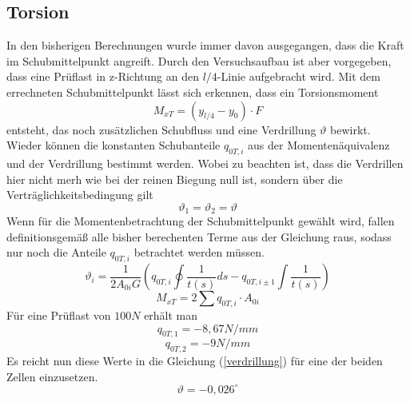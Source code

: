 \subsection{Torsion}
In den bisherigen Berechnungen wurde immer davon ausgegangen, dass die Kraft im Schubmittelpunkt angreift. Durch den Versuchsaufbau ist aber vorgegeben, dass eine Prüflast in z-Richtung an den $l/4$-Linie aufgebracht wird. Mit dem errechneten Schubmittelpunkt lässt sich erkennen, dass ein Torsionsmoment 
\begin{equation}
	M_{xT}=(y_{l/4}-y_{0})\cdot F
\end{equation}
entsteht, das noch zusätzlichen Schubfluss und eine Verdrillung $\vartheta$ bewirkt. Wieder können die konstanten Schubanteile $q_{0T,i}$ aus der Momentenäquivalenz und der Verdrillung bestimmt werden. Wobei zu beachten ist, dass die Verdrillen hier nicht merh wie bei der reinen Biegung null ist, sondern über die Verträglichkeitsbedingung gilt
\begin{equation}
	\vartheta_{1}=\vartheta_{2}=\vartheta
\end{equation}
Wenn für die Momentenbetrachtung der Schubmittelpunkt gewählt wird, fallen definitionsgemäß alle bisher berechenten Terme aus der Gleichung raus, sodass nur noch die Anteile $q_{0T,i}$ betrachtet werden müssen.
\begin{equation}
	\vartheta_{i} = \frac{1}{2A_{0i}G}(q_{0T,i}\oint\frac{1}{t(s)}ds-q_{0T,i\pm1}\int\frac{1}{t(s)})
\end{equation}
\begin{equation}
		M_{xT}=2\sum q_{0T,i}\cdot A_{0i}
\end{equation}
Für eine Prüflast von $100N$ erhält man
\begin{equation}
	q_{0T,1}=-8,67 N/mm
\end{equation}
\begin{equation}
	q_{0T,2}=-9 N/mm
\end{equation}
Es reicht nun diese Werte in die Gleichung (\ref{verdrillung}) für eine der beiden Zellen einzusetzen.
\begin{equation}
	\vartheta =-0,026 ^\circ
\end{equation}

